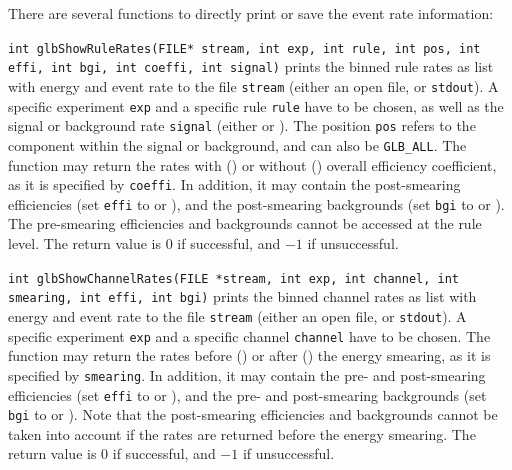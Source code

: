 There are several functions to directly print or save the event rate
information:
\begin{function}
{\tt int glbShowRuleRates(FILE* stream, int exp, int rule, int pos,
int effi, int bgi, int coeffi, int signal)} prints the binned rule rates as
list with energy and event rate to the file {\tt stream} (either an
open file, or {\tt stdout}). A specific experiment {\tt exp} and a 
specific rule {\tt rule} have to be chosen, as well as the signal
or background rate {\tt signal} (either  or ).
The position {\tt pos} refers to the component within the signal or 
background, and can also be {\tt GLB\_ALL}. The function may return
the rates with () or without ()
overall efficiency coefficient, as it is specified by {\tt coeffi}. 
In addition, it may contain the post-smearing efficiencies (set
{\tt effi} to  or ), and the
post-smearing backgrounds (set
{\tt bgi} to  or ). The pre-smearing
efficiencies and backgrounds cannot be accessed at the rule level.
The return value
is $0$ if successful, and $-1$ if unsuccessful.
\end{function}
\begin{function}
{\tt int glbShowChannelRates(FILE *stream,
int exp, int channel, int smearing, int effi, int bgi)}
prints the binned channel rates as
list with energy and event rate to the file {\tt stream} (either an
open file, or {\tt stdout}). A specific experiment {\tt exp} and a 
specific channel {\tt channel} have to be chosen.
The function may return
the rates before () or after ()
the energy smearing, as it is specified by {\tt smearing}.
In addition, it may contain the pre- and post-smearing efficiencies (set
{\tt effi} to  or ), and the
pre- and post-smearing backgrounds (set
{\tt bgi} to  or ). Note that
the post-smearing efficiencies and backgrounds cannot be taken into
account if the rates are returned before the energy smearing.
The return value
is $0$ if successful, and $-1$ if unsuccessful.
\end{function}

